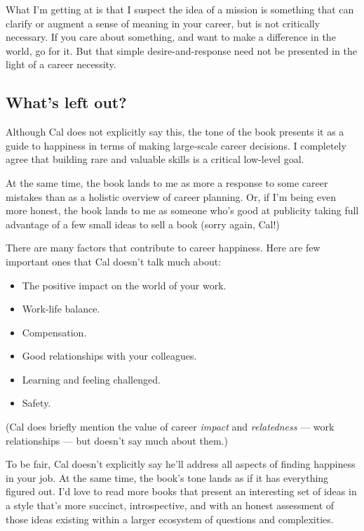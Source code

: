 \documentclass[
]{article}
\providecommand{\tightlist}{%
  \setlength{\itemsep}{0pt}\setlength{\parskip}{0pt}}
\begin{document}
What I'm getting at is that I suspect the idea of a mission is something
that can clarify or augment a sense of meaning in your career, but is
not critically necessary. If you care about something, and want to make
a difference in the world, go for it. But that simple
desire-and-response need not be presented in the light of a career
necessity.

\hypertarget{whats-left-out}{%
\subsection{What's left out?}\label{whats-left-out}}

Although Cal does not explicitly say this, the tone of the book presents
it as a guide to happiness in terms of making large-scale career
decisions. I completely agree that building rare and valuable skills is
a critical low-level goal.

At the same time, the book lands to me as more a response to some career
mistakes than as a holistic overview of career planning. Or, if I'm
being even more honest, the book lands to me as someone who's good at
publicity taking full advantage of a few small ideas to sell a book
(sorry again, Cal!)

There are many factors that contribute to career happiness. Here are few
important ones that Cal doesn't talk much about:

\begin{itemize}
\tightlist
\item
  The positive impact on the world of your work.
\item
  Work-life balance.
\item
  Compensation.
\item
  Good relationships with your colleagues.
\item
  Learning and feeling challenged.
\item
  Safety.
\end{itemize}

(Cal does briefly mention the value of career \emph{impact} and
\emph{relatedness} --- work relationships --- but doesn't say much about
them.)

To be fair, Cal doesn't explicitly say he'll address all aspects of
finding happiness in your job. At the same time, the book's tone lands
as if it has everything figured out. I'd love to read more books that
present an interesting set of ideas in a style that's more succinct,
introspective, and with an honest assessment of those ideas existing
within a larger ecosystem of questions and complexities.
\end{document}
